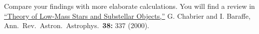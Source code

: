 \begin{enumerate}
Compare your findings with more elaborate calculations.  You will find a review in \href{http://arxiv.org/abs/astro-ph/0006383}{``Theory of Low-Mass Stars and Substellar Objects,''} G. Chabrier and I. Baraffe, Ann.\ Rev.\ Astron.\ Astrophys.\ \textbf{38:} 337 (2000). 
\end{enumerate}
